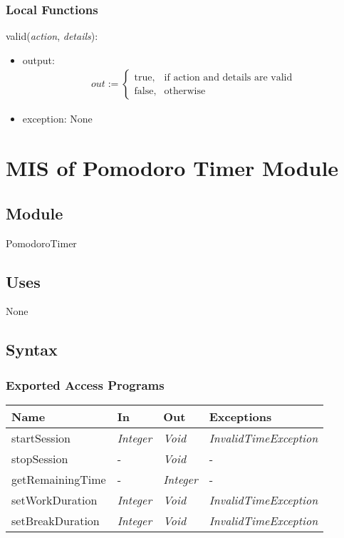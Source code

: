 \documentclass[12pt, titlepage]{article}
\begin{document}
\subsubsection{Local Functions}
\noindent valid(\textit{action}, \textit{details}):
\begin{itemize}
\item output: 
\[
\begin{array}{l}
out := \begin{cases}
\text{true}, & \text{if action and details are valid} \\
\text{false}, & \text{otherwise}
\end{cases}
\end{array}
\]
\item exception: None
\end{itemize}





\newpage
\section{MIS of Pomodoro Timer Module}
\label{PomodoroTimerModule}

\subsection{Module}
PomodoroTimer

\subsection{Uses}
None

\subsection{Syntax}

\subsubsection{Exported Access Programs}
\begin{center}
\begin{tabular}{p{4cm} p{3cm} p{3cm} p{3cm}}
\hline
\textbf{Name} & \textbf{In} & \textbf{Out} & \textbf{Exceptions} \\
\hline
startSession&  \textit{Integer} & \textit{Void} & \textit{InvalidTimeException} \\
stopSession& - & \textit{Void} & - \\
getRemainingTime& - & \textit{Integer} & - \\
setWorkDuration&  \textit{Integer} & \textit{Void} & \textit{InvalidTimeException} \\
setBreakDuration&  \textit{Integer} & \textit{Void} & \textit{InvalidTimeException} \\
\hline
\end{tabular}
\end{center}
\end{document}

